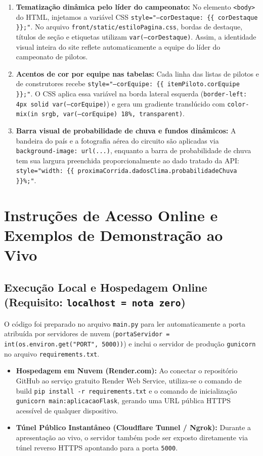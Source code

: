\documentclass[12pt]{article}
\begin{document}
\begin{enumerate}
    \item \textbf{Tematização dinâmica pelo líder do campeonato:} No elemento \texttt{<body>} do HTML, injetamos a variável CSS \texttt{style="--corDestaque: \{\{ corDestaque \}\};"}. No arquivo \texttt{front/static/estiloPagina.css}, bordas de destaque, títulos de seção e etiquetas utilizam \texttt{var(--corDestaque)}. Assim, a identidade visual inteira do site reflete automaticamente a equipe do líder do campeonato de pilotos.
    \item \textbf{Acentos de cor por equipe nas tabelas:} Cada linha das listas de pilotos e de construtores recebe \texttt{style="--corEquipe: \{\{ itemPiloto.corEquipe \}\};"}. O CSS aplica essa variável na borda lateral esquerda (\texttt{border-left: 4px solid var(--corEquipe)}) e gera um gradiente translúcido com \texttt{color-mix(in srgb, var(--corEquipe) 18\%, transparent)}.
    \item \textbf{Barra visual de probabilidade de chuva e fundos dinâmicos:} A bandeira do país e a fotografia aérea do circuito são aplicadas via \texttt{background-image: url(...)}, enquanto a barra de probabilidade de chuva tem sua largura preenchida proporcionalmente ao dado tratado da API: \texttt{style="width: \{\{ proximaCorrida.dadosClima.probabilidadeChuva \}\}\%;"}.
\end{enumerate}

\section{Instruções de Acesso Online e Exemplos de Demonstração ao Vivo}

\subsection{Execução Local e Hospedagem Online (Requisito: \texttt{localhost = nota zero})}

O código foi preparado no arquivo \texttt{main.py} para ler automaticamente a porta atribuída por servidores de nuvem (\texttt{portaServidor = int(os.environ.get("PORT", 5000))}) e inclui o servidor de produção \texttt{gunicorn} no arquivo \texttt{requirements.txt}.
\begin{itemize}
    \item \textbf{Hospedagem em Nuvem (Render.com):} Ao conectar o repositório GitHub ao serviço gratuito Render Web Service, utiliza-se o comando de build \texttt{pip install -r requirements.txt} e o comando de inicialização \texttt{gunicorn main:aplicacaoFlask}, gerando uma URL pública HTTPS acessível de qualquer dispositivo.
    \item \textbf{Túnel Público Instantâneo (Cloudflare Tunnel / Ngrok):} Durante a apresentação ao vivo, o servidor também pode ser exposto diretamente via túnel reverso HTTPS apontando para a porta \texttt{5000}.
\end{itemize}
\end{document}
